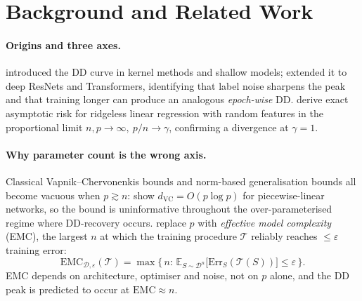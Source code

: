 \section{Background and Related Work}
\label{sec:background}

\paragraph{Origins and three axes.} \citet{belkin2019reconciling} introduced the DD curve in kernel methods and shallow models; \citet{nakkiran2021deep} extended it to deep ResNets and Transformers, identifying that label noise sharpens the peak and that training longer can produce an analogous \emph{epoch-wise} DD. \citet{hastie2022surprises} derive exact asymptotic risk for ridgeless linear regression with random features in the proportional limit $n,p\to\infty,\ p/n\to\gamma$, confirming a divergence at $\gamma=1$.

\paragraph{Why parameter count is the wrong axis.} Classical Vapnik--Chervonenkis bounds and norm-based generalisation bounds \citep{bartlett2017spectrally,neyshabur2018pac} all become vacuous when $p\gtrsim n$: \citet{bartlett2019nearly} show $d_{\mathrm{VC}}=O(p\log p)$ for piecewise-linear networks, so the bound is uninformative throughout the over-parameterised regime where DD-recovery occurs. \citet{nakkiran2021deep} replace $p$ with \emph{effective model complexity} (EMC), the largest $n$ at which the training procedure $\mathcal{T}$ reliably reaches $\le\varepsilon$ training error:
\begin{equation}
  \label{eq:emc}
  \mathrm{EMC}_{\mathcal{D},\varepsilon}(\mathcal{T}) = \max\!\big\{\,n:\, \mathbb{E}_{S\sim\mathcal{D}^n}\!\big[\mathrm{Err}_S(\mathcal{T}(S))\big] \le \varepsilon \,\big\}.
\end{equation}
EMC depends on architecture, optimiser and noise, not on $p$ alone, and the DD peak is predicted to occur at $\mathrm{EMC}\approx n$.

